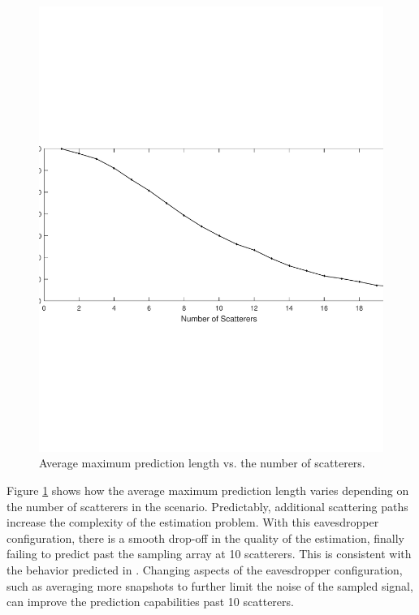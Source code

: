 \documentclass{allertonproc}
\begin{document}
\begin{figure}[tbp]
\begin{center}
\includegraphics[width=6in]{numScatterers}
\caption{Average maximum prediction length vs. the number of scatterers.}\label{Scatter}
\end{center}
\end{figure}
Figure \ref{Scatter} shows how the average maximum prediction length varies depending on the number of scatterers in the scenario. Predictably, additional scattering paths increase the complexity of the estimation problem. With this eavesdropper configuration, there is a smooth drop-off in the quality of the estimation, finally failing to predict past the sampling array at 10 scatterers. This is consistent with the behavior predicted in \cite{kckpVTC2015}. Changing aspects of the eavesdropper configuration, such as averaging more snapshots to further limit the noise of the sampled signal, can improve the prediction capabilities past 10 scatterers.
\end{document}
